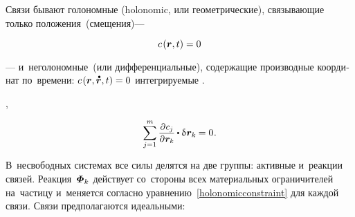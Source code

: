 \begin{otherlanguage}{russian}

Связи бывают
голономные
(holonomic, или геометрические),
связывающие только положения~(смещения)\:---
\ru{,}
\ru{,}

\nopagebreak\vspace{-0.1em}
\begin{equation}\label{holonomicconstraint}
c\hspace{.2ex}(\bm{r}, t) = 0
\end{equation}

\vspace{-0.1em}\noindent
--- и~неголономные~(или дифференциальные),
содержащие производные координат по~времени:
${c\hspace{.2ex}(\locationvector, \mathdotabove{\locationvector}, t) = 0}$
 интегрируемые
.

,

\nopagebreak\vspace{-0.1em}\begin{equation}\label{requirementforvirtualdisplacements}
\displaystyle \sum_{\smash{j=1}}^{m}
\scalebox{.92}{$ \displaystyle
   \frac{\raisemath{-0.12em}{\partial \hspace{.1ex} c_{j}}}{\partial \hspace{.1ex} \locationvector_k} $}
\hspace{-0.1ex} \dotp
\variation{\hspace{.1ex}\locationvector_k}
\hspace{-0.1ex} =
0
\hspace{.1ex} .
\vspace{-0.25em}\end{equation}

В~несвободных системах все силы делятся на две группы:
активные
и~реакции связей.
Реакция~$\mathboldPhi_k$ действует со~стороны всех материальных ограничителей на~частицу  и~меняется согласно уравнению~\eqref{holonomicconstraint} для каждой связи.
Связи предполагаются идеальными:


\end{otherlanguage}
